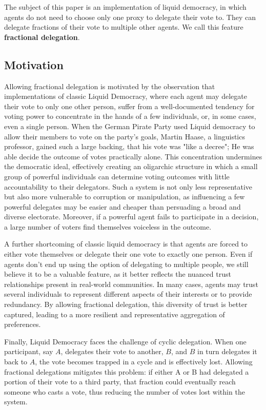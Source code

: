 The subject of this paper is an implementation of liquid democracy, in which agents do not need to choose only one proxy to delegate their vote to. They can delegate fractions of their vote to multiple other agents. We call this feature \textbf{fractional delegation}. 

\subsection{Motivation}
\label{subsec:motivation}

Allowing fractional delegation is motivated by the observation that implementations of classic Liquid Democracy, where each agent may delegate their vote to only one other person, suffer from a well-documented tendency for voting power to concentrate in the hands of a few individuals, or, in some cases, even a single person. \cite{klingVotingBehaviourPower2015, caragiannisContributionCritiqueLiquid2019, beckerWhenCanLiquid2021} When the German Pirate Party used Liquid democracy to allow their members to vote on the party's goals, Martin Haase, a linguistics professor, gained such a large backing, that his vote was "like a decree"; He was able decide the outcome of votes practically alone. \cite{beckerWebPlatformMakes2012} This concentration undermines the democratic ideal, effectively creating an oligarchic structure in which a small group of powerful individuals can determine voting outcomes with little accountability to their delegators. Such a system is not only less representative but also more vulnerable to corruption or manipulation, as influencing a few powerful delegates may be easier and cheaper than persuading a broad and diverse electorate. Moreover, if a powerful agent fails to participate in a decision, a large number of voters find themselves voiceless in the outcome.

A further shortcoming of classic liquid democracy is that agents are forced to either vote themselves or delegate their one vote to exactly one person. Even if agents don't end up using the option of delegating to multiple people, we still believe it to be a valuable feature, as it better reflects the nuanced trust relationships present in real-world communities. In many cases, agents may trust several individuals to represent different aspects of their interests or to provide redundancy. By allowing fractional delegation, this diversity of trust is better captured, leading to a more resilient and representative aggregation of preferences. 

Finally, Liquid Democracy faces the challenge of cyclic delegation. When one participant, say $A$, delegates their vote to another, $B$, and $B$ in turn delegates it back to $A$, the vote becomes trapped in a cycle and is effectively lost. \cite{behrensCircularDelegationsMyth2015} Allowing fractional delegations mitigates this problem: if either A or B had delegated a portion of their vote to a third party, that fraction could eventually reach someone who casts a vote, thus reducing the number of votes lost within the system.

